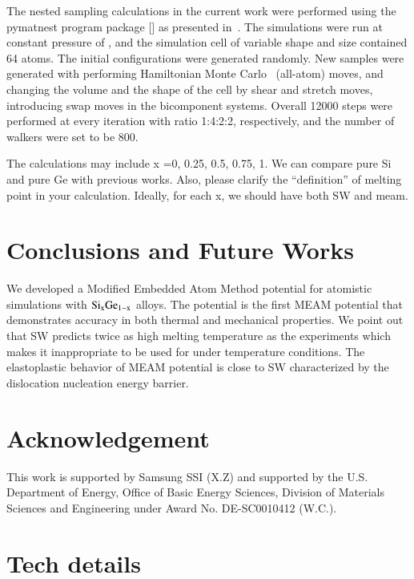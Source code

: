 \documentclass[review]{elsarticle}
\begin{document}
The nested sampling calculations in the current work were performed using the pymatnest program package [\cite{pymatnest}] as presented in~\cite{pt_phase_dias_ns}. The simulations were run at constant pressure of , and the simulation cell of variable shape and size contained 64 atoms. 
The initial configurations were generated randomly. 
New samples were generated with performing Hamiltonian Monte Carlo~\cite{pymatnest_paper} (all-atom) moves, and changing the volume and the shape of the cell by shear and stretch moves, introducing swap moves in the bicomponent systems.
Overall 12000 steps were performed at every iteration with ratio 1:4:2:2, respectively, and the number of walkers were set to be 800.

The calculations may include x =0, 0.25, 0.5, 0.75, 1. We can compare pure Si and pure Ge with previous works. Also, please clarify the ``definition'' of melting point in your calculation. Ideally, for each x, we should have both SW and meam.



\section{Conclusions and Future Works}
\label{sec:conclusions}

We developed a Modified Embedded Atom Method potential for atomistic simulations with $\rm Si_xGe_{1-x}$ alloys. The potential is the first MEAM potential that demonstrates accuracy in both thermal and mechanical properties. We point out that SW predicts twice as high melting temperature as the experiments which makes it inappropriate to be used for under temperature conditions. The elastoplastic behavior of MEAM potential is close to SW characterized by the dislocation nucleation energy barrier. 


\section{Acknowledgement}
This work is supported by Samsung SSI (X.Z) and  supported by the U.S. Department of Energy, Office of Basic Energy Sciences, Division of Materials Sciences and Engineering under Award No. DE-SC0010412 (W.C.).
%

\iffalse
\section{Tech details}
\end{document}
